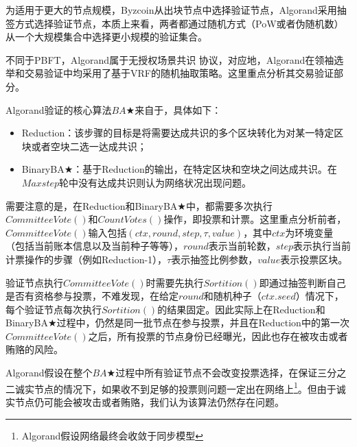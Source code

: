 为适用于更大的节点规模，Byzcoin从出块节点中选择验证节点\cite{kogias2016enhancing}，Algorand采用抽签方式选择验证节点\cite{gilad2017algorand}，本质上来看，两者都通过随机方式（PoW或者伪随机数）从一个大规模集合中选择更小规模的验证集合。



不同于PBFT，Algorand\cite{gilad2017algorand}属于无授权场景共识 协议，对应地，Algorand在领袖选举和交易验证中均采用了基于VRF的随机抽取策略。这里重点分析其交易验证部分。

Algorand验证的核心算法$BA\bigstar$来自于\cite{miller2016honey}，具体如下：
\begin{itemize}
	\item Reduction：该步骤的目标是将需要达成共识的多个区块转化为对某一特定区块或者空块二选一达成共识；
	\item BinaryBA$\bigstar$：基于Reduction的输出，在特定区块和空块之间达成共识。在$Maxstep$轮中没有达成共识则认为网络状况出现问题。
\end{itemize}

需要注意的是，在Reduction和BinaryBA$\bigstar$中，都需要多次执行$CommitteeVote()$和$CountVotes()$操作，即投票和计票。这里重点分析前者，$CommitteeVote()$输入包括$(ctx,round,step,\tau,value)$，其中$ctx$为环境变量（包括当前账本信息以及当前种子等等），$round$表示当前轮数，$step$表示执行当前计票操作的步骤（例如Reduction-1），$\tau$表示抽签比例参数，$value$表示投票区块。

验证节点执行$CommitteeVote()$时需要先执行$Sortition()$即通过抽签判断自己是否有资格参与投票，不难发现，在给定$round$和随机种子（$ctx.seed$）情况下，每个验证节点每次执行$Sortition()$的结果固定。因此实际上在Reduction和BinaryBA$\bigstar$过程中，仍然是同一批节点在参与投票，并且在Reduction中的第一次$CommitteeVote()$之后，所有投票的节点身份已经曝光，因此也存在被攻击或者贿赂的风险。

Algorand假设在整个$BA\bigstar$过程中所有验证节点不会改变投票选择，在保证三分之二诚实节点的情况下，如果收不到足够的投票则问题一定出在网络上\footnote{Algorand假设网络最终会收敛于同步模型}。但由于诚实节点仍可能会被攻击或者贿赂，我们认为该算法仍然存在问题。


